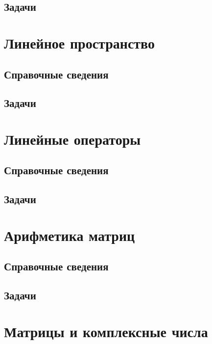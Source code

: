 \subsection*{Задачи}



\section{Линейное пространство}

\subsection*{Справочные сведения}

\subsection*{Задачи}



\section{Линейные операторы}

\subsection*{Справочные сведения}

\subsection*{Задачи}



\section{Арифметика матриц}

\subsection*{Справочные сведения}

\subsection*{Задачи}



\section{Матрицы и комплексные числа}


